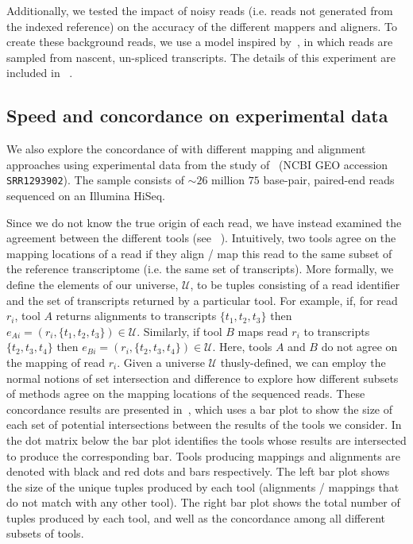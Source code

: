 Additionally, we tested the impact of noisy reads (i.e. reads not generated from the indexed reference) on the accuracy of the different mappers and aligners. To create these background reads, we use a model inspired by~\citep{gilbert2004elongator}, in which reads are sampled from nascent, un-spliced transcripts. The details of this experiment are included in ~.

\subsection{Speed and concordance on experimental data}

We also explore the concordance of \rapmap with different mapping and alignment approaches using experimental data from the study of~\citet{cho2014high} (NCBI GEO accession \texttt{SRR1293902}).  The sample consists of $\sim26$ million $75$ base-pair, paired-end reads sequenced on an Illumina HiSeq.

Since we do not know the true origin of each read, we have instead examined the agreement between the different tools (see ~). Intuitively, two tools agree on the mapping locations of a read if they align / map this read to the same subset of the reference transcriptome (i.e. the same set of transcripts). More formally, we define the elements of our universe, $\mathcal{U}$, to be tuples consisting of a read identifier and the set of transcripts returned by a particular tool.  For example, if, for read $r_i$, tool $A$ returns alignments to transcripts $\{t_1, t_2, t_3\}$ then $e_{Ai} = \left(r_i, \{t_1, t_2, t_3\}\right) \in \mathcal{U}$.  Similarly, if tool $B$ maps read $r_i$ to transcripts $\{t_2, t_3, t_4\}$ then $e_{Bi} = \left(r_i, \{t_2, t_3, t_4\}\right) \in \mathcal{U}$. Here, tools $A$ and $B$ do not agree on the mapping of read $r_i$. Given a universe $\mathcal{U}$ thusly-defined, we can employ the normal notions of set intersection and difference to explore how different subsets of methods agree on the mapping locations of the sequenced reads.  These concordance results are presented in~, which uses a bar plot to show the size of each set of potential intersections between the results of the tools we consider. In  the dot matrix below the bar plot identifies the tools whose results are intersected to produce the corresponding bar. Tools producing mappings and alignments are denoted with black and red dots and bars respectively. The left bar plot shows the size of the unique tuples produced by each tool (alignments / mappings that do not match with any other tool). The right bar plot shows the total number of tuples produced by each tool, and well as the concordance among all different subsets of tools. 

